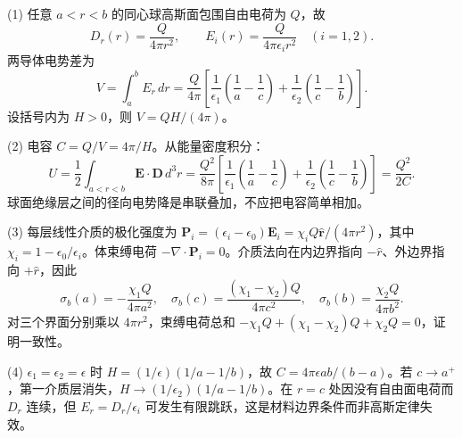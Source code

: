 (1) 任意 \(a<r<b\) 的同心球高斯面包围自由电荷为 \(Q\)，故
\[
D_r(r)=\frac{Q}{4\pi r^2},\qquad E_i(r)=\frac{Q}{4\pi\epsilon_i r^2}\quad (i=1,2).
\]
两导体电势差为
\[
V=\int_a^bE_r\,dr
=\frac{Q}{4\pi}\left[\frac1{\epsilon_1}\left(\frac1a-\frac1c\right)+\frac1{\epsilon_2}\left(\frac1c-\frac1b\right)\right].
\]
设括号内为 \(H>0\)，则 \(V=QH/(4\pi)\)。

(2) 电容 \(C=Q/V=4\pi/H\)。从能量密度积分：
\[
U=\frac12\int_{a<r<b}\boldsymbol E\cdot\boldsymbol D\,d^3r
=\frac{Q^2}{8\pi}\left[\frac1{\epsilon_1}\left(\frac1a-\frac1c\right)+\frac1{\epsilon_2}\left(\frac1c-\frac1b\right)\right]
=\frac{Q^2}{2C}.
\]
球面绝缘层之间的径向电势降是串联叠加，不应把电容简单相加。

(3) 每层线性介质的极化强度为 \(\boldsymbol P_i=(\epsilon_i-\epsilon_0)\boldsymbol E_i=\chi_i Q\hat{\boldsymbol r}/(4\pi r^2)\)，其中 \(\chi_i=1-\epsilon_0/\epsilon_i\)。体束缚电荷 \(-\nabla\cdot\boldsymbol P_i=0\)。介质法向在内边界指向 \(-\hat r\)、外边界指向 \(+\hat r\)，因此
\[
\sigma_b(a)=-\frac{\chi_1Q}{4\pi a^2},\quad
\sigma_b(c)=\frac{(\chi_1-\chi_2)Q}{4\pi c^2},\quad
\sigma_b(b)=\frac{\chi_2Q}{4\pi b^2}.
\]
对三个界面分别乘以 \(4\pi r^2\)，束缚电荷总和 \(-\chi_1Q+(\chi_1-\chi_2)Q+\chi_2Q=0\)，证明一致性。

(4) \(\epsilon_1=\epsilon_2=\epsilon\) 时 \(H=(1/\epsilon)(1/a-1/b)\)，故 \(C=4\pi\epsilon ab/(b-a)\)。若 \(c\to a^+\)，第一介质层消失，\(H\to(1/\epsilon_2)(1/a-1/b)\)。在 \(r=c\) 处因没有自由面电荷而 \(D_r\) 连续，但 \(E_r=D_r/\epsilon_i\) 可发生有限跳跃，这是材料边界条件而非高斯定律失效。
